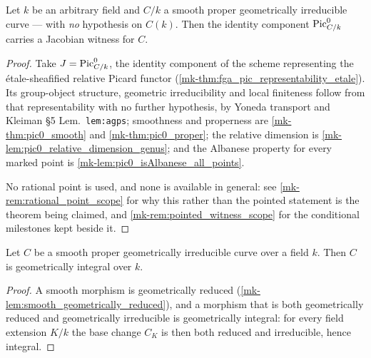 \begin{theorem}
  \label{mk-def:picardJacobianWitness}

  Let \(k\) be an arbitrary field and \(C/k\) a smooth proper geometrically
  irreducible curve --- with \emph{no} hypothesis on \(C(k)\). Then the identity
  component \(\operatorname{Pic}^0_{C/k}\) carries a Jacobian witness for \(C\).
\end{theorem}

\begin{proof}
  Take \(J = \operatorname{Pic}^0_{C/k}\), the identity component of the scheme representing the
  \'etale-sheafified relative Picard functor
  (\ref{mk-thm:fga_pic_representability_etale}). Its group-object structure, geometric
  irreducibility and local finiteness follow from that representability with no
  further hypothesis, by Yoneda transport and Kleiman \S 5 Lem.~\texttt{lem:agps};
  smoothness and properness are \ref{mk-thm:pic0_smooth} and \ref{mk-thm:pic0_proper};
  the relative dimension is \ref{mk-lem:pic0_relative_dimension_genus}; and the
  Albanese property for every marked point is
  \ref{mk-lem:pic0_isAlbanese_all_points}.

  No rational point is used, and none is available in general: see
  \ref{mk-rem:rational_point_scope} for why this rather than the pointed statement is
  the theorem being claimed, and \ref{mk-rem:pointed_witness_scope} for the conditional
  milestones kept beside it.
\end{proof}

\begin{lemma}
  \label{mk-lem:curve_geometrically_integral}
  \leanok
  Let \(C\) be a smooth proper geometrically irreducible curve over a field \(k\).
  Then \(C\) is geometrically integral over \(k\).
\end{lemma}

\begin{proof}
  \leanok
  A smooth morphism is geometrically reduced
  (\ref{mk-lem:smooth_geometrically_reduced}), and a morphism that is both
  geometrically reduced and geometrically irreducible is geometrically integral:
  for every field extension \(K/k\) the base change \(C_K\) is then both reduced
  and irreducible, hence integral.
\end{proof}

